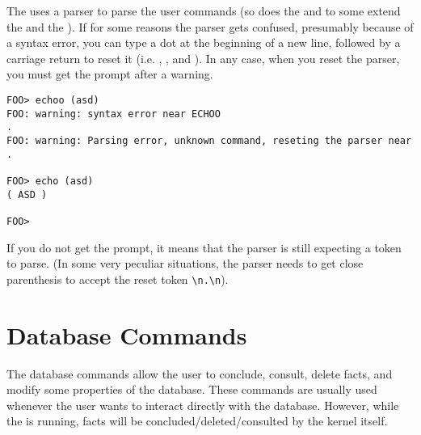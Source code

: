 The \CPK{} uses a parser to parse the user commands (so does the \OPRSS{}
and to some extend the \OPE{} and the \XPK{}). If for some reasons the parser
gets confused, presumably because of a syntax error, you can type a dot at the
beginning of a new line, followed by a carriage return to reset it (i.e.
, , and ). In any case, when you reset the parser, you
must get the prompt after a warning.

\begin{verbatim}
FOO> echoo (asd)
FOO: warning: syntax error near ECHOO
.
FOO: warning: Parsing error, unknown command, reseting the parser near .

FOO> echo (asd)
( ASD )

FOO>
\end{verbatim}

If you do not get the prompt, it means that the parser is still expecting a
token to parse. (In some very peculiar situations, the parser needs to get close
parenthesis \samp{)} to accept the reset token \verb+\n.\n+).


\section{\CPK{} Database Commands}

The database commands allow the user to conclude, consult, delete facts, and
modify some properties of the database. These commands are usually used
whenever the user wants to interact directly with the database. However, while
the \CPK{} is running, facts will be concluded/deleted/consulted by the kernel
itself.

